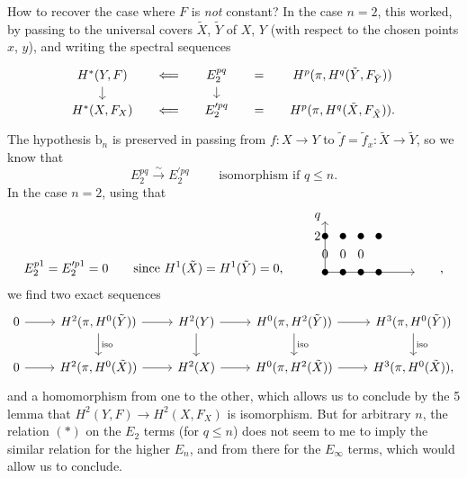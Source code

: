 \documentclass[11pt]{article}
\newcommand{\printedpage}[1]{\marginpar{\footnotesize p.~#1}}
\newcommand{\msp}[1]{\marginpar{\footnotesize [#1]}}
\begin{document}
How to recover the case where $F$ is \textit{not} constant? In the case $n=2$, this worked, by passing to the universal covers $\tilde{X}$, $\tilde{Y}$ of $X$, $Y$ (with respect to the chosen points $x$, $y$), and writing the spectral sequences
\[
\begin{tikzcd}[row sep=small, column sep=small]
H^*(Y,F) \arrow[d] & \Longleftarrow & E_2^{pq} \arrow[d] & = & H^p(\pi,H^q(\tilde{Y},F_{\tilde{Y}})) \\
H^*(X,F_X) & \Longleftarrow & E^{\prime pq}_2 & = & H^p(\pi,H^q(\tilde{X},F_{\tilde{X}})).
\end{tikzcd}
\]
The hypothesis $\mathrm{b}_n$ is preserved in passing from $f : X \longrightarrow Y$ to $\tilde{f} = \tilde{f}_x : \tilde{X} \longrightarrow \tilde{Y}$, so we know that
\printedpage{122}
\msp{page 183}
\[
E_2^{pq} \xrightarrow{\ \sim\ } E^{\prime pq}_2 \qquad \text{ isomorphism if } q \le n. \tag*{$(*)$}
\]
In the case $n=2$, using that
\[
E_2^{p1} = E^{\prime p1}_2 = 0 \qquad \text{since } H^1(\tilde{X}) = H^1(\tilde{Y}) = 0, \qquad
\begin{tikzpicture}[baseline=0pt, x=0.5cm, y=0.5cm]
\draw[->] (0,0) -- (0,2.8);
\draw[->] (0,0) -- (5,0);
\node[above left] at (0,2.6) {$q$};
\node[left] at (0,2) {$2$};
\foreach \i in {0,...,3} { \fill (\i,2) circle (2.5pt); \fill (\i,0) circle (2.5pt); }
\node at (0,1) {$0$};
\node at (1,1) {$0$};
\node at (2,1) {$0$};
\end{tikzpicture}
\qquad ,
\]
we find two exact sequences
\[
\begin{tikzcd}
0 \arrow[r] & H^2(\pi,H^0(\tilde{Y})) \arrow[r] \arrow[d, "\text{iso}"] & H^2(Y) \arrow[r] \arrow[d] & H^0(\pi,H^2(\tilde{Y})) \arrow[r] \arrow[d, "\text{iso}"] & H^3(\pi,H^0(\tilde{Y})) \arrow[d, "\text{iso}"] \\
0 \arrow[r] & H^2(\pi,H^0(\tilde{X})) \arrow[r] & H^2(X) \arrow[r] & H^0(\pi,H^2(\tilde{X})) \arrow[r] & H^3(\pi,H^0(\tilde{X})),
\end{tikzcd}
\]
and a homomorphism from one to the other, which allows us to conclude by the 5 lemma that $H^2(Y,F) \longrightarrow H^2(X,F_X)$ is isomorphism. But for arbitrary $n$, the relation $(*)$ on the $E_2$ terms (for $q \le n$) does not seem to me to imply the similar relation for the higher $E_n$, and from there for the $E_\infty$ terms, which would allow us to conclude.
\end{document}
